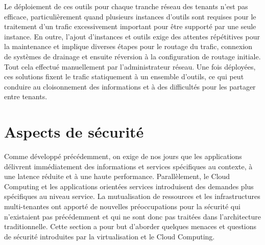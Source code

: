 Le déploiement de ces outils pour chaque tranche réseau des tenants n'est pas efficace, particulièrement quand plusieurs instances d'outils sont requises pour le traitement d'un trafic excessivement important pour être supporté par une seule instance. En outre, l'ajout d'instances et outils exige des attentes répétitives pour la maintenance et implique diverses étapes pour le routage du trafic, connexion de systèmes de drainage et ensuite réversion à la configuration de routage initiale. Tout cela effectué manuellement par l'administrateur réseau. Une fois déployées, ces solutions fixent le trafic statiquement à un ensemble d'outils, ce qui peut conduire au cloisonnement des informations et à des difficultés pour les partager entre tenants. \cite{bigSwitchTapModernDC}  \cite{cloudReadyNetworkJuniper}







\section{Aspects de sécurité}

Comme développé précédemment, on exige de nos jours que les applications délivrent immédiatement des informations et services spécifiques au contexte, à une latence réduite et à une haute performance. Parallèlement, le Cloud Computing et les applications orientées services introduisent des demandes plus spécifiques au niveau service. La mutualisation de ressources et les infrastructures multi-tenantes ont apporté de nouvelles préoccupations pour la sécurité qui n'existaient pas précédemment et qui ne sont donc pas traitées dans l'architecture traditionnelle. Cette section a pour but d'aborder quelques menaces et questions de sécurité introduites par la virtualisation et le Cloud Computing.

